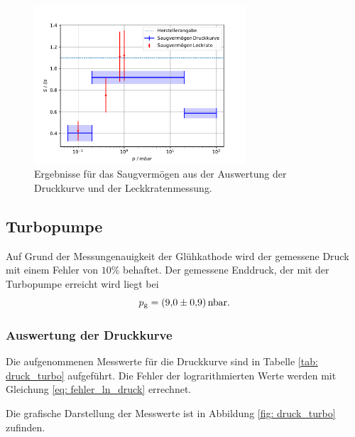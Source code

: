 \begin{figure}[h]
  \centering
  \includegraphics[width=0.7\textwidth]{../Messdaten/plots/dreh/dreh_leck_und_druck.pdf}
  \caption{Ergebnisse für das Saugvermögen aus der Auswertung der Druckkurve und der Leckkratenmessung.}
  \label{fig: dreh_druck_leck}
\end{figure}

\subsection{Turbopumpe}
Auf Grund der Messungenauigkeit der Glühkathode wird der gemessene
Druck mit einem Fehler von $10\%$ behaftet.
Der gemessene Enddruck, der mit der Turbopumpe erreicht wird liegt bei
\begin{equation}
  \label{eq:enddruck_drehschieber}
  p_{\mathrm{g}}=\SI{9.0 \pm 0.9}{\nano\bar}. %
\end{equation}

\subsubsection{Auswertung der Druckkurve}
Die aufgenommenen Messwerte für die Druckkurve sind in Tabelle \ref{tab: druck_turbo}
aufgeführt. Die Fehler der lograrithmierten Werte werden mit Gleichung \eqref{eq: fehler_ln_druck} errechnet. %


Die grafische Darstellung der Messwerte ist in Abbildung \ref{fig: druck_turbo} zufinden. %

